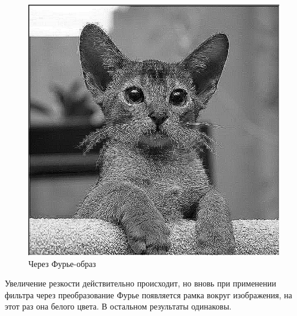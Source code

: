 \documentclass[a4paper]{article}
\begin{document}
\begin{figure}[H]
\begin{minipage}{0.35\textwidth}
        \includegraphics[width=\textwidth]{sources/3third/sharpened_fft.png}
        \caption{Через Фурье-образ}
    \end{minipage}
    \hspace{5em}
\end{figure}
Увеличение резкости действительно происходит, но вновь при применении фильтра через преобразование Фурье появляется рамка вокруг изображения, на этот раз она белого цвета. В остальном результаты одинаковы.
\end{document}
